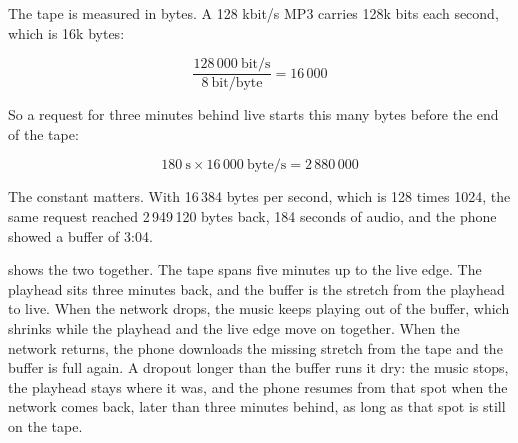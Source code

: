\documentclass[11pt,a4paper]{article}
\begin{document}
The tape is measured in bytes. A 128 kbit/s MP3 carries 128k bits each second, which is 16k bytes:

\[ \frac{128\,000\ \text{bit/s}}{8\ \text{bit/byte}} = 16\,000 \tag*{[byte/s]} \]

So a request for three minutes behind live starts this many bytes before the end of the tape:

\[ 180\ \text{s} \times 16\,000\ \text{byte/s} = 2\,880\,000 \tag*{[byte]} \]

The constant matters. With 16\,384 bytes per second, which is 128 times 1024, the same request reached 2\,949\,120 bytes back, 184 seconds of audio, and the phone showed a buffer of 3:04.

 shows the two together. The tape spans five minutes up to the live edge. The playhead sits three minutes back, and the buffer is the stretch from the playhead to live. When the network drops, the music keeps playing out of the buffer, which shrinks while the playhead and the live edge move on together. When the network returns, the phone downloads the missing stretch from the tape and the buffer is full again. A dropout longer than the buffer runs it dry: the music stops, the playhead stays where it was, and the phone resumes from that spot when the network comes back, later than three minutes behind, as long as that spot is still on the tape.
\end{document}
